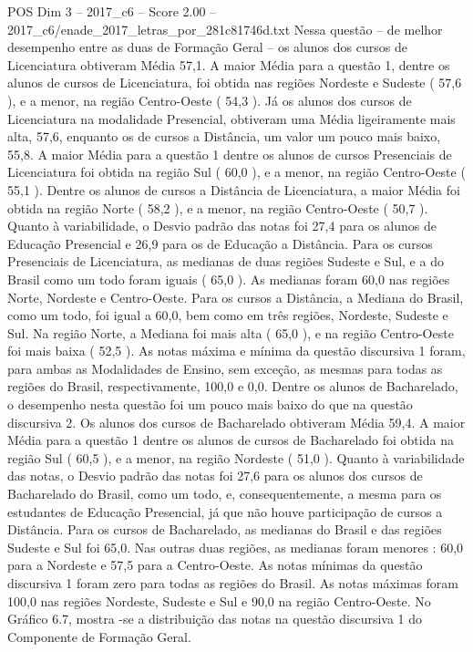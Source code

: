 \begin{textsample}{POS Dim 3 – 2017\_c6 – Score 2.00 – 2017\_c6/enade\_2017\_letras\_por\_281c81746d.txt}
Nessa questão – de melhor desempenho entre as duas de Formação Geral – os alunos dos cursos de Licenciatura obtiveram Média 57,1.
A maior Média para a questão 1, dentre os alunos de cursos de Licenciatura, foi obtida nas regiões Nordeste e Sudeste ( 57,6 ), e a menor, na região Centro-Oeste ( 54,3 ).
Já os alunos dos cursos de Licenciatura na modalidade Presencial, obtiveram uma Média ligeiramente mais alta, 57,6, enquanto os de cursos a Distância, um valor um pouco mais baixo, 55,8.
A maior Média para a questão 1 dentre os alunos de cursos Presenciais de Licenciatura foi obtida na região Sul ( 60,0 ), e a menor, na região Centro-Oeste ( 55,1 ).
Dentre os alunos de cursos a Distância de Licenciatura, a maior Média foi obtida na região Norte ( 58,2 ), e a menor, na região Centro-Oeste ( 50,7 ).
Quanto à variabilidade, o Desvio padrão das notas foi 27,4 para os alunos de Educação Presencial e 26,9 para os de Educação a Distância.
Para os cursos Presenciais de Licenciatura, as medianas de duas regiões Sudeste e Sul, e a do Brasil como um todo foram iguais ( 65,0 ).
As medianas foram 60,0 nas regiões Norte, Nordeste e Centro-Oeste.
Para os cursos a Distância, a Mediana do Brasil, como um todo, foi igual a 60,0, bem como em três regiões, Nordeste, Sudeste e Sul.
Na região Norte, a Mediana foi mais alta ( 65,0 ), e na região Centro-Oeste foi mais baixa ( 52,5 ).
As notas máxima e mínima da questão discursiva 1 foram, para ambas as Modalidades de Ensino, sem exceção, as mesmas para todas as regiões do Brasil, respectivamente, 100,0 e 0,0.
Dentre os alunos de Bacharelado, o desempenho nesta questão foi um pouco mais baixo do que na questão discursiva 2.
Os alunos dos cursos de Bacharelado obtiveram Média 59,4.
A maior Média para a questão 1 dentre os alunos de cursos de Bacharelado foi obtida na região Sul ( 60,5 ), e a menor, na região Nordeste ( 51,0 ).
Quanto à variabilidade das notas, o Desvio padrão das notas foi 27,6 para os alunos dos cursos de Bacharelado do Brasil, como um todo, e, consequentemente, a mesma para os estudantes de Educação Presencial, já que não houve participação de cursos a Distância.
Para os cursos de Bacharelado, as medianas do Brasil e das regiões Sudeste e Sul foi 65,0.
Nas outras duas regiões, as medianas foram menores : 60,0 para a Nordeste e 57,5 para a Centro-Oeste.
As notas mínimas da questão discursiva 1 foram zero para todas as regiões do Brasil.
As notas máximas foram 100,0 nas regiões Nordeste, Sudeste e Sul e 90,0 na região Centro-Oeste.
No Gráfico 6.7, mostra -se a distribuição das notas na questão discursiva 1 do Componente de Formação Geral.

\end{textsample}
